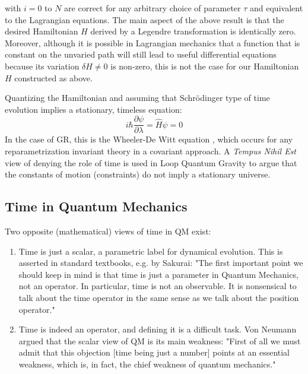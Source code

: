 \documentclass[twoside,a4paper,11pt]{article}
\numberwithin{equation}{section}
\begin{document}
with $i = 0$ to $N$ are correct for any arbitrary choice of parameter $\tau$ and equivalent to the Lagrangian equations. The main aspect of the above result is that the desired Hamiltonian $H$ derived by a Legendre transformation is identically zero. Moreover, although it is possible in Lagrangian mechanics that a function that is constant on the unvaried path will still lead to useful differential equations because its variation $\delta H \neq 0$ is non-zero, this is not the case for our Hamiltonian $H$ constructed as above.

Quantizing the Hamiltonian and assuming that Schr{\"o}dinger type of time evolution implies a stationary, timeless equation:
\begin{equation}
    i \hbar \frac{\partial \psi}{\partial \lambda} = \hat{H} \psi = 0
\end{equation}
In the case of GR, this is the Wheeler-De Witt equation \cite{WdWeq}, which occurs for any reparametrization invariant theory in a covariant approach. A \textit{Tempus Nihil Est} \cite{AndersonTimeQG} view of denying the role of time is used in Loop Quantum Gravity \cite{rovelliLQG} to argue that the constants of motion (constraints) do not imply a stationary universe. 


\subsection{Time in Quantum Mechanics}
Two opposite (mathematical) views of time in QM exist:  

\begin{enumerate}
    \item 
    Time is just a scalar, a parametric label for dynamical evolution. This is asserted in standard textbooks, e.g. by Sakurai: "The first important point we should keep in mind is that time is just a parameter in Quantum Mechanics, not an operator. In particular, time is not an observable. It is nonsensical to talk about the time operator in the same sense as we talk about the position operator." \cite{SakuraiQM}
    
    \item
   Time is indeed an operator, and defining it is a difficult task. Von Neumann argued that the scalar view of QM is its main weakness: "First of all we must admit that this objection [time being just a number] points at an essential weakness, which is, in fact, the chief weakness of quantum mechanics." \cite{NeumannQM}
\end{enumerate}
\end{document}
